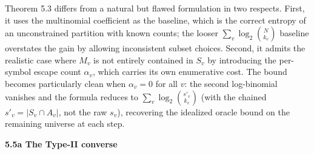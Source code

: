 \documentclass[
]{article}
\begin{document}
Theorem 5.3 differs from a natural but flawed formulation in two
respects. First, it uses the multinomial coefficient as the baseline,
which is the correct entropy of an unconstrained partition with
known counts; the looser $\sum_v \log_2 \binom{N}{k_v}$ baseline
overstates the gain by allowing inconsistent subset choices. Second,
it admits the realistic case where $M_v$ is not entirely contained
in $S_v$ by introducing the per-symbol escape count $\alpha_v$,
which carries its own enumerative cost. The bound becomes
particularly clean when $\alpha_v = 0$ for all $v$: the second
log-binomial vanishes and the formula reduces to
$\sum_v \log_2 \binom{s'_v}{k_v}$ (with the chained $s'_v = |S_v \cap A_v|$,
not the raw $s_v$), recovering the idealized oracle bound on the
remaining universe at each step.

\textbf{5.5a The Type-II converse}
\end{document}
